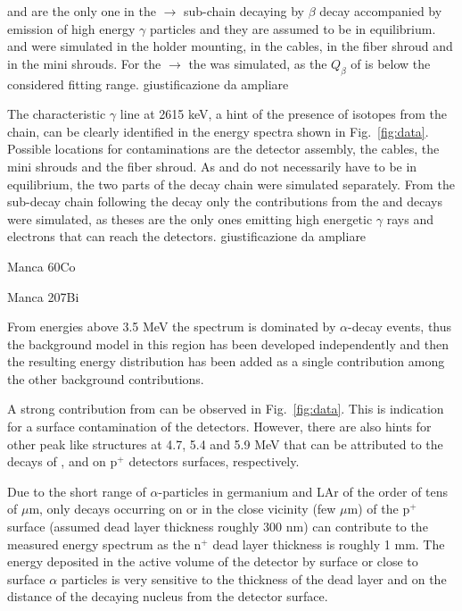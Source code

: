   and  are the only one in the  $\rightarrow$  sub-chain decaying by $\beta$ decay accompanied by emission of high energy $\gamma$ particles and they are assumed to be in equilibrium.  and  were simulated in the holder mounting, in the cables, in the fiber shroud and in the mini shrouds. For the  $\rightarrow$  the  was simulated, as the $Q_\beta$ of  is below the considered fitting range. {\color{red}giustificazione da ampliare}

 The characteristic $\gamma$ line at 2615 keV, a hint of the presence of isotopes from the  chain, can be clearly identified in the energy spectra shown in Fig.~\ref{fig:data}. Possible locations for contaminations are the detector assembly, the cables, the mini shrouds and the fiber shroud. As  and  do not necessarily have to be in equilibrium, the two parts of the decay chain were simulated separately. From the sub-decay chain following the  decay only the contributions from the  and  decays were simulated, as theses are the only ones emitting high energetic $\gamma$ rays and electrons that can reach the detectors. {\color{red}giustificazione da ampliare}

{\color{red}Manca 60Co}%

{\color{red}Manca 207Bi}%

 From energies above 3.5 MeV the spectrum is dominated by $\alpha$-decay events, thus the background model in this region has been developed independently and then the resulting energy distribution has been added as a single contribution among the other background contributions.

A strong contribution from  can be observed in Fig.~\ref{fig:data}. This is indication for a surface contamination of the detectors. However, there are also hints for other peak like structures at 4.7, 5.4 and 5.9 MeV that can be attributed to the decays of ,  and  on p$^+$ detectors surfaces, respectively.

Due to the short range of $\alpha$-particles in germanium and LAr of the order of tens of $\mu$m, only decays occurring on or in the close vicinity (few $\mu$m) of the p$^+$ surface (assumed dead layer thickness roughly 300 nm) can contribute to the measured energy spectrum as the n$^+$ dead layer thickness is roughly 1 mm. The energy deposited in the active volume of the detector by surface or close to surface $\alpha$ particles is very sensitive to the thickness of the dead layer and on the distance of the decaying nucleus from the detector surface.

